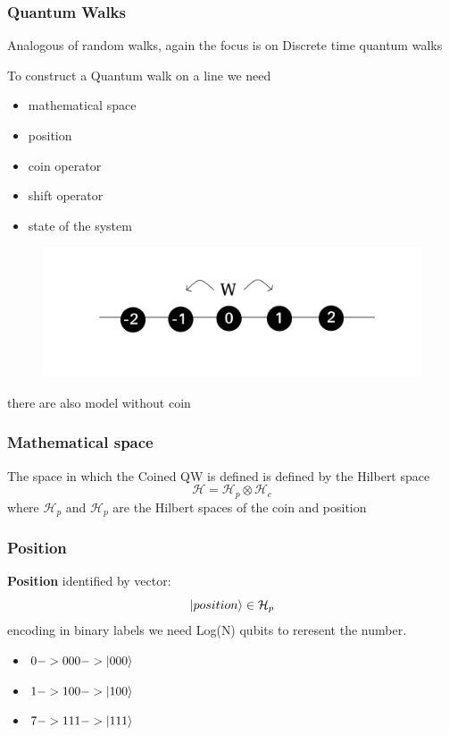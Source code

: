 \documentclass{beamer}
\begin{document}
\begin{frame}
    \frametitle{Quantum Walks}
    Analogous of random walks, again the focus is on Discrete time quantum walks

    \begin{example}
        To construct a Quantum walk on a line we need
        \begin{itemize}
            \item mathematical space
            \item position
            \item coin operator
            \item shift operator
            \item state of the system
        \end{itemize}
    \end{example}

    \begin{figure}[h!]
        \includegraphics[scale=0.2]{img/random_walk_line.png}
        \centering
    \end{figure}
    there are also model without coin
\end{frame}


\begin{frame}
    \frametitle{Mathematical space}
    The space in which the Coined QW is defined is defined by the Hilbert space
    \begin{equation}
        \mathcal{H}=\mathcal{H}_{p}\otimes\mathcal{H}_{c}
    \end{equation}
    where $\mathcal{H}_{p}$ and $\mathcal{H}_{p}$ are the Hilbert spaces 
    of the coin and position  
\end{frame}

\begin{frame}
    \frametitle{Position}
    \textbf{Position} identified by vector:
    \begin{equation}
        \ket{position} \in \mathcal{H}_{p}
    \end{equation} 
    encoding in binary labels we need Log(N) qubits to reresent the number.

    \begin{example}[$N < 8 => 3 qubits$]
        \begin{itemize}
            \item $0 -> 000 -> \ket{000}$
            \item $1 -> 100 -> \ket{100}$
            \item $7 -> 111 -> \ket{111}$
        \end{itemize}
    \end{example}    
\end{frame}
\end{document}
